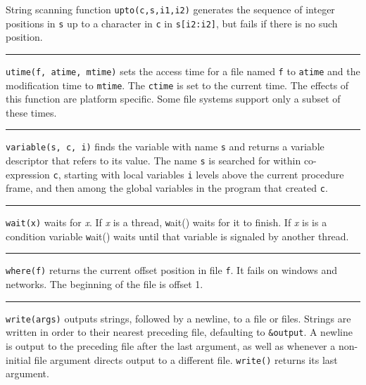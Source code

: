 \noindent
String scanning function \texttt{upto(c,s,i1,i2)}
generates the sequence of integer positions in \texttt{s} up to a
character in \texttt{c} in \texttt{s[i2:i2]}, but fails if there is no
such position.

\bigskip\hrule\vspace{0.1cm}

\noindent
\texttt{utime(f, atime, mtime)} sets the access
time for a file named \texttt{f} to \texttt{atime} and the modification
time to \texttt{mtime}. The \texttt{ctime} is set to the current time.
The effects of this function are platform specific. Some file systems
support only a subset of these times.

\bigskip\hrule\vspace{0.1cm}

\noindent
{}\texttt{variable(s, c, i)} finds the variable
with name \texttt{s} and returns a variable descriptor that refers to
its value. The name \texttt{s} is searched for within co-expression
\texttt{c}, starting with local variables \texttt{i} levels above the
current procedure frame, and then among the global variables in the
program that created \texttt{c}.

\bigskip\hrule\vspace{0.1cm}

\noindent
{}\texttt{wait(x)} waits for {\textit x}. If {\textit x} is
a thread, {\texttt wait()} waits for it to finish. If {\textit x} is
is a condition variable {\texttt wait()} waits until that variable is
signaled by another thread.

\bigskip\hrule\vspace{0.1cm}

\noindent
{}\texttt{where(f)} returns the
current offset position in file \texttt{f}. It fails on windows and
networks. The beginning of the file is offset 1.

\bigskip\hrule\vspace{0.1cm}

\noindent
\texttt{write(args)} outputs strings, followed by a newline, to a file
or files. Strings are written in order to their nearest preceding file,
defaulting to \texttt{\&output}. A newline is output to the preceding
file after the last argument, as well as whenever a non-initial file
argument directs output to a different file.
\texttt{write()} returns its last argument.

